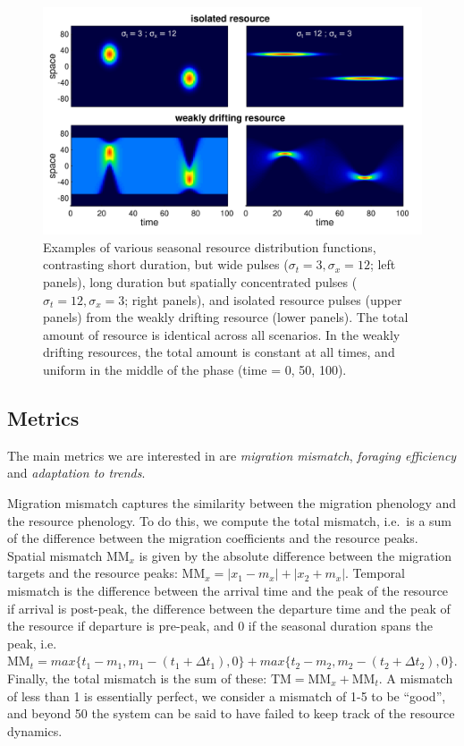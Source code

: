 \documentclass[utf8]{frontiersSCNS} %
\begin{document}
\begin{figure}[t!]
	\includegraphics[width = \textwidth]{figures/ResourceExamples.png}
	
	\caption{\label{fig_ResourceExamples}  Examples of various seasonal resource distribution functions, contrasting short duration, but wide pulses ($\sigma_t = 3, \sigma_x = 12$; left panels), long duration but spatially concentrated pulses ($\sigma_t = 12, \sigma_x = 3$; right panels), and isolated resource pulses (upper panels) from the weakly drifting resource (lower panels). The total amount of resource is identical across all scenarios. In the weakly drifting resources, the total amount is constant at all times, and uniform in the middle of the phase (time = 0, 50, 100).}
\end{figure}

\subsection{Metrics}

The main metrics we are interested in are \emph{migration mismatch}, \emph{foraging efficiency} and \emph{adaptation to trends}.

Migration mismatch captures the similarity between the migration phenology and the resource phenology. To do this, we compute the total mismatch, i.e.~is a sum of the difference between the migration coefficients and the resource peaks. Spatial mismatch $\text{MM}_x$ is given by the absolute difference between the migration targets and the resource peaks: $\text{MM}_x = |x_1 - m_x| + |x_2 + m_x|$. Temporal mismatch is the difference between the arrival time and the peak of the resource if arrival is post-peak, the difference between the departure time and the peak of the resource if departure is pre-peak, and 0 if the seasonal duration spans the peak, i.e.~$\text{MM}_t = max\{t_1 - m_1, m_1 - (t_1 + \Delta t_1), 0\} + max\{t_2 - m_2, m_2 - (t_2 + \Delta t_2), 0\}$. Finally, the total mismatch is the sum of these: $\text{TM} = \text{MM}_x + \text{MM}_t$. A mismatch of less than 1 is essentially perfect, we consider a mismatch of 1-5 to be ``good'', and beyond 50 the system can be said to have failed to keep track of the resource dynamics.
\end{document}
